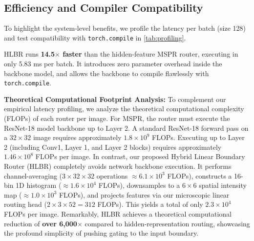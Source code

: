 \documentclass{article}
\theoremstyle{plain}
\theoremstyle{definition}
\theoremstyle{remark}
\begin{document}
\subsection{Efficiency and Compiler Compatibility}
To highlight the system-level benefits, we profile the latency per batch (size 128) and test compatibility with \texttt{torch.compile} in \cref{tab:profiling}.

\begin{table}[h]
\caption{Latency profiling and compiler compatibility on ResNet-18.}
\label{tab:profiling}
\begin{center}
\begin{small}
\end{small}
\end{center}
\end{table}

HLBR runs \textbf{14.5$\times$ faster} than the hidden-feature MSPR router, executing in only 5.83 ms per batch. It introduces zero parameter overhead inside the backbone model, and allows the backbone to compile flawlessly with \texttt{torch.compile}.

\textbf{Theoretical Computational Footprint Analysis:} To complement our empirical latency profiling, we analyze the theoretical computational complexity (FLOPs) of each router per image. For MSPR, the router must execute the ResNet-18 model backbone up to Layer 2. A standard ResNet-18 forward pass on a $32 \times 32$ image requires approximately $1.8 \times 10^9$ FLOPs. Executing up to Layer 2 (including Conv1, Layer 1, and Layer 2 blocks) requires approximately $1.46 \times 10^8$ FLOPs per image. In contrast, our proposed Hybrid Linear Boundary Router (HLBR) completely avoids network backbone execution. It performs channel-averaging ($3 \times 32 \times 32$ operations $\approx 6.1 \times 10^3$ FLOPs), constructs a 16-bin 1D histogram ($\approx 1.6 \times 10^4$ FLOPs), downsamples to a $6 \times 6$ spatial intensity map ($\approx 1.0 \times 10^3$ FLOPs), and projects features via our microscopic linear routing head ($2 \times 3 \times 52 = 312$ FLOPs). This yields a total of only $2.3 \times 10^4$ FLOPs per image. Remarkably, HLBR achieves a theoretical computational reduction of \textbf{over 6,000$\times$} compared to hidden-representation routing, showcasing the profound simplicity of pushing gating to the input boundary.
\end{document}
